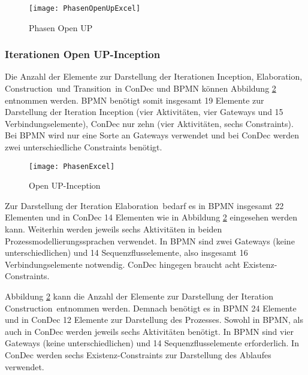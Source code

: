 \begin{figure}[htp]
\begin{center}
  \texttt{[image: PhasenOpenUpExcel]} %
  \caption{Phasen Open UP}
  \label{fig:PhasenOpenUpExcel}
\end{center}
\end{figure}



\subsubsection {Iterationen Open UP-Inception}

Die Anzahl der Elemente zur Darstellung der Iterationen \grqq Inception\grqq, \grqq Elaboration\grqq, \grqq Construction\grqq \ und \grqq Transition\grqq \ in ConDec und BPMN können Abbildung \ref{fig:PhasenExcel} entnommen werden. BPMN benötigt somit insgesamt 19 Elemente zur Darstellung der Iteration Inception (vier Aktivitäten, vier Gateways und 15 Verbindungselemente), ConDec nur zehn (vier Aktivitäten, sechs Constraints). Bei BPMN wird nur eine Sorte an Gateways verwendet und bei ConDec werden zwei unterschiedliche Constraints benötigt.\newline
\begin{figure}[htp]
\begin{center}
  \texttt{[image: PhasenExcel]} %
  \caption{Open UP-Inception}
  \label{fig:PhasenExcel}
\end{center}
\end{figure}

Zur Darstellung der Iteration \grqq Elaboration\grqq \ bedarf es in BPMN insgesamt 22 Elementen und in ConDec 14 Elementen wie in Abbildung \ref{fig:PhasenExcel} eingesehen werden kann. Weiterhin werden jeweils sechs Aktivitäten in beiden Prozessmodellierungssprachen verwendet. In BPMN sind zwei Gateways (keine unterschiedlichen) und 14 Sequenzflusselemente, also insgesamt 16 Verbindungselemente notwendig. ConDec hingegen braucht acht Existenz-Constraints. \newline

Abbildung \ref{fig:PhasenExcel} kann die Anzahl der Elemente zur Darstellung der Iteration \grqq Construction\grqq \ entnommen werden. Demnach benötigt es in BPMN 24 Elemente und in ConDec 12 Elemente zur Darstellung des Prozesses. Sowohl in BPMN, als auch in ConDec werden jeweils sechs Aktivitäten benötigt. In BPMN sind vier Gateways (keine unterschiedlichen) und 14 Sequenzflusselemente erforderlich. In ConDec werden sechs Existenz-Constraints zur Darstellung des Ablaufes verwendet.\newline


